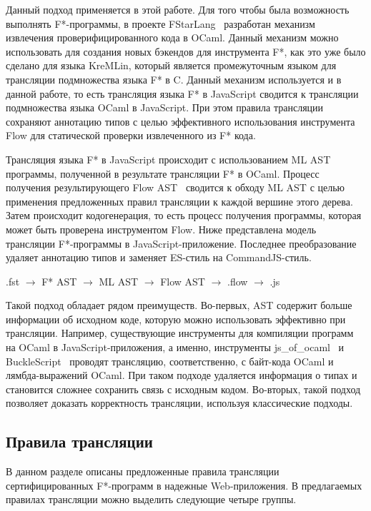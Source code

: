 Данный подход применяется в этой работе. Для того чтобы была возможность выполнять F*-программы, в проекте FStarLang~\cite{fstargh} разработан механизм извлечения проверифицированного кода в OCaml. Данный механизм можно использовать для создания новых бэкендов для инструмента F*, как это уже было сделано для языка KreMLin, который является промежуточным языком для трансляции подмножества языка F* в C. Данный механизм используется и в данной работе, то есть трансляция языка F* в JavaScript сводится к трансляции подмножества языка OCaml в JavaScript. При этом правила трансляции сохраняют аннотацию типов с целью эффективного использования инструмента Flow для статической проверки извлеченного из F* кода.

Трансляция языка F* в JavaScript происходит с использованием ML AST программы, полученной в результате трансляции F* в OCaml. Процесс получения результирующего Flow AST~\cite{flow_ast} сводится к обходу ML AST с целью применения предложенных правил трансляции к каждой вершине этого дерева. Затем происходит кодогенерация, то есть процесс получения программы, которая может быть проверена инструментом Flow. Ниже представлена модель трансляции F*-программы в JavaScript-приложение. Последнее преобразование удаляет аннотацию типов и заменяет ES-стиль на CommandJS-стиль.

\begin{center}
.fst $\to$ F* AST $\to$  ML AST $\to$ Flow AST $\to$ .flow $\to$  .js
\end{center}

Такой подход обладает рядом преимуществ. Во-первых, AST содержит больше информации об исходном коде, которую можно использовать эффективно при трансляции. Например, существующие инструменты для компиляции программ на OCaml в JavaScript-приложения, а именно, инструменты js\_of\_ocaml~\cite{ocamljs} и BuckleScript~\cite{bucklescript} проводят трансляцию, соответственно, с байт-кода OCaml и лямбда-выражений OCaml. При таком подходе удаляется информация о типах и становится сложнее сохранить связь с исходным кодом. Во-вторых, такой подход позволяет доказать корректность трансляции, используя классические подходы. 

\subsection{Правила трансляции}

В данном разделе описаны предложенные правила трансляции сертифицированных F*-программ в надежные Web-приложения. В предлагаемых правилах трансляции можно выделить следующие четыре группы.

